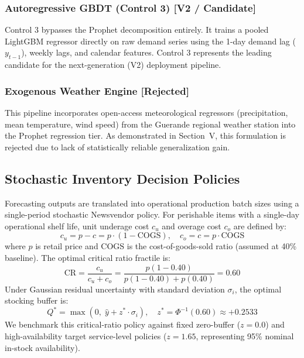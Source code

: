 \documentclass[conference]{IEEEtran}
\begin{document}
\subsubsection{Autoregressive GBDT (Control 3) [V2 / Candidate]}
Control 3 bypasses the Prophet decomposition entirely. It trains a pooled LightGBM regressor directly on raw demand series using the 1-day demand lag ($y_{t-1}$), weekly lags, and calendar features. Control 3 represents the leading candidate for the next-generation (V2) deployment pipeline.

\subsubsection{Exogenous Weather Engine [Rejected]}
This pipeline incorporates open-access meteorological regressors (precipitation, mean temperature, wind speed) from the Guerande regional weather station into the Prophet regression tier. As demonstrated in Section~V, this formulation is rejected due to lack of statistically reliable generalization gain.

\subsection{Stochastic Inventory Decision Policies}
Forecasting outputs are translated into operational production batch sizes using a single-period stochastic Newsvendor policy. For perishable items with a single-day operational shelf life, unit underage cost $c_u$ and overage cost $c_o$ are defined by:
\begin{equation}
c_u = p - c = p \cdot (1 - \text{COGS}), \quad c_o = c = p \cdot \text{COGS}
\end{equation}
where $p$ is retail price and $\text{COGS}$ is the cost-of-goods-sold ratio (assumed at 40\% baseline). The optimal critical ratio fractile is:
\begin{equation}
\text{CR} = \frac{c_u}{c_u + c_o} = \frac{p(1 - 0.40)}{p(1 - 0.40) + p(0.40)} = 0.60
\end{equation}
Under Gaussian residual uncertainty with standard deviation $\sigma_i$, the optimal stocking buffer is:
\begin{equation}
Q^* = \max\left(0, \;\hat{y} + z^* \cdot \sigma_i\right), \quad z^* = \Phi^{-1}(0.60) \approx +0.2533
\end{equation}
We benchmark this critical-ratio policy against fixed zero-buffer ($z=0.0$) and high-availability target service-level policies ($z=1.65$, representing 95\% nominal in-stock availability).
\end{document}

